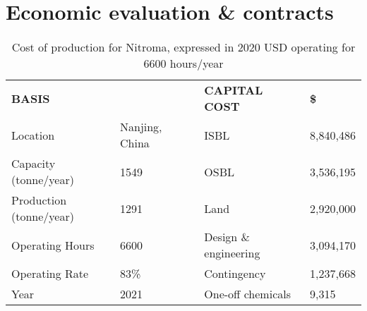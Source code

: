 \section{Economic evaluation \& contracts}

\begin{table}[H]
\centering
\caption{Cost of production for Nitroma, expressed in 2020 USD operating for 6600 hours/year}
\label{Cost_of_production}
\begin{tabular}{llllll}
\hline
\textbf{BASIS}                                & \textbf{}                              & \textbf{}                                                          & \textbf{CAPITAL COST}       &                       & \textbf{\$}                              \\ \cline{1-2} \cline{4-6} 
Location                                      & Nanjing, China                         &                                                                    & ISBL                        &                       & 8,840,486                                \\
Capacity (tonne/year)                         & 1549                                   &                                                                    & OSBL                        &                       & 3,536,195                                \\
Production (tonne/year)                       & 1291                                   &                                                                    & Land                        &                       & 2,920,000                                \\
Operating Hours                               & 6600                                   &                                                                    & \multicolumn{2}{l}{Design \& engineering}           & 3,094,170                                \\
Operating Rate                                & 83\%                                   &                                                                    & Contingency                 &                       & 1,237,668                                \\
Year                                          & 2021                                   &                                                                    & \multicolumn{2}{l}{One-off chemicals}               & 9,315                                    \\ \cline{6-6} 

\end{tabular}
\end{table}
